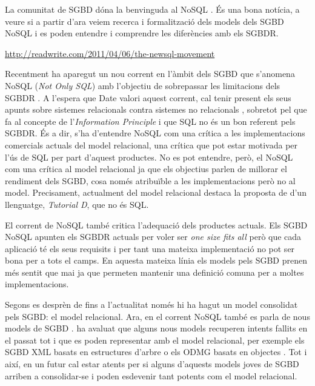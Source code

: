 \todo{} La comunitat de SGBD dóna la benvinguda al NoSQL
\cite{atzeni13:relational_model_dead}. És una bona notícia, a veure si
a partir d'ara veiem recerca i formalització dels models dels SGBD
NoSQL i es poden entendre i comprendre les diferències amb els SGBDR.

\url{http://readwrite.com/2011/04/06/the-newsql-movement}


Recentment ha aparegut un nou corrent en l'àmbit dels SGBD que
s'anomena NoSQL (\emph{Not Only SQL}) amb l'objectiu de sobrepassar
les limitacions dels SGBDR \parencite{edlich:nosql,stonebraker10}.  A
l'espera que Date valori aquest corrent, cal tenir present els seus
apunts sobre sistemes relacionals contra sistemes no
relacionals \parencite[part 7]{date06}, sobretot pel que fa al
concepte de l'\emph{Information Principle} i que SQL no és un bon
referent pels SGBDR. És a dir, s'ha d'entendre NoSQL com una crítica a
les implementacions comercials actuals del model relacional, una
crítica que pot estar motivada per l'ús de SQL per part d'aquest
productes.  No es pot entendre, però, el NoSQL com una crítica al
model relacional ja que els objectius parlen de millorar el rendiment
dels SGBD, cosa només atribuïble a les implementacions però no al
model. Precisament, actualment del model relacional destaca la
proposta de \citeauthor{date:tutoriald} d'un llenguatge,
\emph{Tutorial D}, que no és SQL.


El corrent de NoSQL també critica l'adequació dels productes actuals.
Els SGBD NoSQL apunten els SGBDR actuals per voler ser \emph{one size
  fits all} \parencite{stonebraker07,stonebraker09} però que cada
aplicació té els seus requisits i per tant una mateixa implementació
no pot ser bona per a tots el camps.  En aquesta mateixa línia els
models pels SGBD prenen més sentit que mai ja que permeten mantenir
una definició comuna per a moltes implementacions.


Segons es desprèn de \textcite{date06} fins a l'actualitat només hi ha
hagut un model consolidat pels SGBD: el model relacional.  Ara, en el
corrent NoSQL també es parla de nous models de
SGBD \parencite{edlich:nosql,stonebraker09:scidb}.
\citeauthor{date06} ha avaluat que alguns nous models recuperen
intents fallits en el passat tot i que es poden representar amb el
model relacional, per exemple els SGBD XML basats en estructures
d'arbre \parencite[cap.~14]{date06} \parencite[cap.~27]{date04:introduction8}
o els ODMG basats en objectes \parencite[cap.~27]{date06}. Tot i així,
en un futur cal estar atents per si alguns d'aquests models joves de
SGBD arriben a consolidar-se i poden esdevenir tant potents com el
model relacional.


